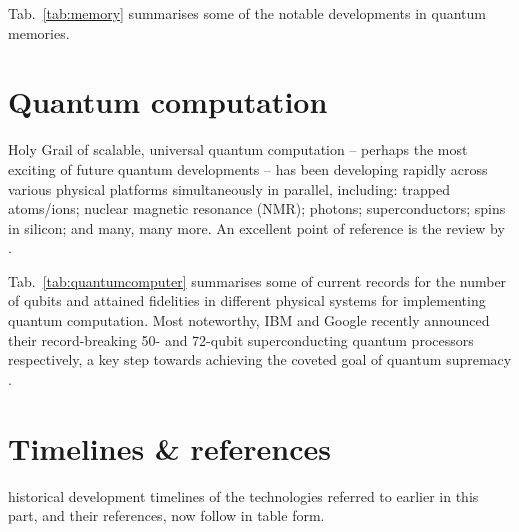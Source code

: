Tab.~\ref{tab:memory} summarises some of the notable developments in quantum memories.

%
%

\section{Quantum computation}

 Holy Grail of scalable, universal quantum computation -- perhaps the most exciting of future quantum developments -- has been developing rapidly across various physical platforms simultaneously in parallel, including: trapped atoms/ions; nuclear magnetic resonance (NMR); photons; superconductors; spins in silicon; and many, many more. An excellent point of reference is the review by \cite{bib:ladd2010quantum}.

Tab.~\ref{tab:quantumcomputer} summarises some of current records for the number of qubits and attained fidelities in different physical systems for implementing quantum computation. Most noteworthy, IBM and Google recently announced their record-breaking 50- and 72-qubit superconducting quantum processors respectively, a key step towards achieving the coveted goal of quantum supremacy \cite{bib:savage2018quantum, bib:neill2018blueprint, bib:harrow2017quantum}.


%
%

\section{Timelines \& references}\label{sec:timeline_tables}

 historical development timelines of the technologies referred to earlier in this part, and their references, now follow in table form.

